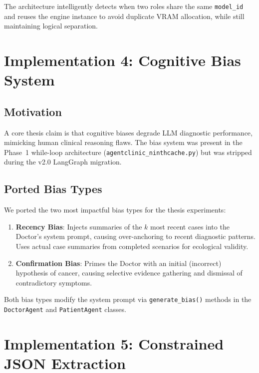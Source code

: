 \documentclass[12pt, a4paper]{article}
\begin{document}
The architecture intelligently detects when two roles share the same
\texttt{model\_id} and reuses the engine instance to avoid duplicate VRAM
allocation, while still maintaining logical separation.

\section{Implementation 4: Cognitive Bias System}
\label{sec:bias}

\subsection{Motivation}

A core thesis claim is that cognitive biases degrade LLM diagnostic
performance, mimicking human clinical reasoning flaws. The bias system was
present in the Phase~1 while-loop architecture (\texttt{agentclinic\_ninthcache.py})
but was stripped during the v2.0 LangGraph migration.

\subsection{Ported Bias Types}

We ported the two most impactful bias types for the thesis experiments:

\begin{enumerate}
    \item \textbf{Recency Bias}: Injects summaries of the $k$ most recent
    cases into the Doctor's system prompt, causing over-anchoring to recent
    diagnostic patterns. Uses actual case summaries from completed scenarios
    for ecological validity.

    \item \textbf{Confirmation Bias}: Primes the Doctor with an initial
    (incorrect) hypothesis of cancer, causing selective evidence gathering
    and dismissal of contradictory symptoms.
\end{enumerate}

Both bias types modify the system prompt via \texttt{generate\_bias()} methods
in the \texttt{DoctorAgent} and \texttt{PatientAgent} classes.

\section{Implementation 5: Constrained JSON Extraction}
\label{sec:json}
\end{document}
